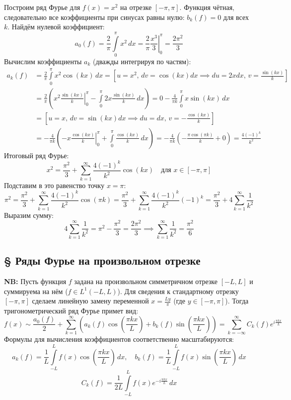 \documentclass[12pt,a4paper]{article}
\begin{document}
\begin{Example}[ Разложение функции $f(x) = x^2$ и вычисление суммы ряда]
Построим ряд Фурье для $f(x) = x^2$ на отрезке $[-\pi, \pi]$.
Функция чётная, следовательно все коэффициенты при синусах равны нулю: $b_k(f) = 0$ для всех $k$.
Найдём нулевой коэффициент:
$$ a_0(f) = \frac{2}{\pi} \int\limits_0^\pi x^2 \, dx = \frac{2}{\pi} \left. \frac{x^3}{3} \right|_0^\pi = \frac{2\pi^2}{3} $$
Вычислим коэффициенты $a_k$ (дважды интегрируя по частям):
\begin{align*}
    a_k(f) &= \frac{2}{\pi} \int\limits_0^\pi x^2 \cos(kx) \, dx = \left[ u=x^2, \, dv=\cos(kx)dx \implies du=2xdx, \, v=\frac{\sin(kx)}{k} \right] \\
    &= \frac{2}{\pi} \left( \left. x^2 \frac{\sin(kx)}{k} \right|_0^\pi - \int\limits_0^\pi 2x \frac{\sin(kx)}{k} \, dx \right) = 0 - \frac{4}{\pi k} \int\limits_0^\pi x \sin(kx) \, dx \\
    &= \left[ u=x, \, dv=\sin(kx)dx \implies du=dx, \, v=-\frac{\cos(kx)}{k} \right] \\
    &= -\frac{4}{\pi k} \left( \left. -x \frac{\cos(kx)}{k} \right|_0^\pi + \int\limits_0^\pi \frac{\cos(kx)}{k} \, dx \right) = -\frac{4}{\pi k} \left( -\frac{\pi \cos(\pi k)}{k} + 0 \right) = \frac{4 (-1)^k}{k^2}
\end{align*}
Итоговый ряд Фурье:
$$ x^2 = \frac{\pi^2}{3} + \sum\limits_{k=1}^{\infty} \frac{4(-1)^k}{k^2} \cos(kx) \quad \text{для } x \in [-\pi, \pi] $$
Подставим в это равенство точку $x = \pi$:
$$ \pi^2 = \frac{\pi^2}{3} + \sum\limits_{k=1}^{\infty} \frac{4(-1)^k}{k^2} \cos(\pi k) = \frac{\pi^2}{3} + \sum\limits_{k=1}^{\infty} \frac{4(-1)^k}{k^2} (-1)^k = \frac{\pi^2}{3} + 4 \sum\limits_{k=1}^{\infty} \frac{1}{k^2} $$
Выразим сумму:
$$ 4 \sum\limits_{k=1}^{\infty} \frac{1}{k^2} = \pi^2 - \frac{\pi^2}{3} = \frac{2\pi^2}{3} \implies \sum\limits_{k=1}^{\infty} \frac{1}{k^2} = \frac{\pi^2}{6} $$
\end{Example}


\subsection{§ Ряды Фурье на произвольном отрезке}

\textbf{NB:} Пусть функция $f$ задана на произвольном симметричном отрезке $[-L, L]$ и суммируема на нём ($f \in L^1(-L, L)$). 
Для сведения к стандартному отрезку $[-\pi, \pi]$ сделаем линейную замену переменной $x = \frac{L y}{\pi}$ (где $y \in [-\pi, \pi]$). 
Тогда тригонометрический ряд Фурье примет вид:
$$ f(x) \sim \frac{a_0(f)}{2} + \sum\limits_{k=1}^{\infty} \left( a_k(f) \cos\left(\frac{\pi k x}{L}\right) + b_k(f) \sin\left(\frac{\pi k x}{L}\right) \right) = \sum\limits_{k=-\infty}^{\infty} C_k(f) e^{i \frac{\pi k x}{L}} $$
Формулы для вычисления коэффициентов соответственно масштабируются:
$$ a_k(f) = \frac{1}{L} \int\limits_{-L}^L f(x) \cos\left(\frac{\pi k x}{L}\right) \, dx, \quad b_k(f) = \frac{1}{L} \int\limits_{-L}^L f(x) \sin\left(\frac{\pi k x}{L}\right) \, dx $$
$$ C_k(f) = \frac{1}{2L} \int\limits_{-L}^L f(x) e^{-i \frac{\pi k x}{L}} \, dx $$
\end{document}
